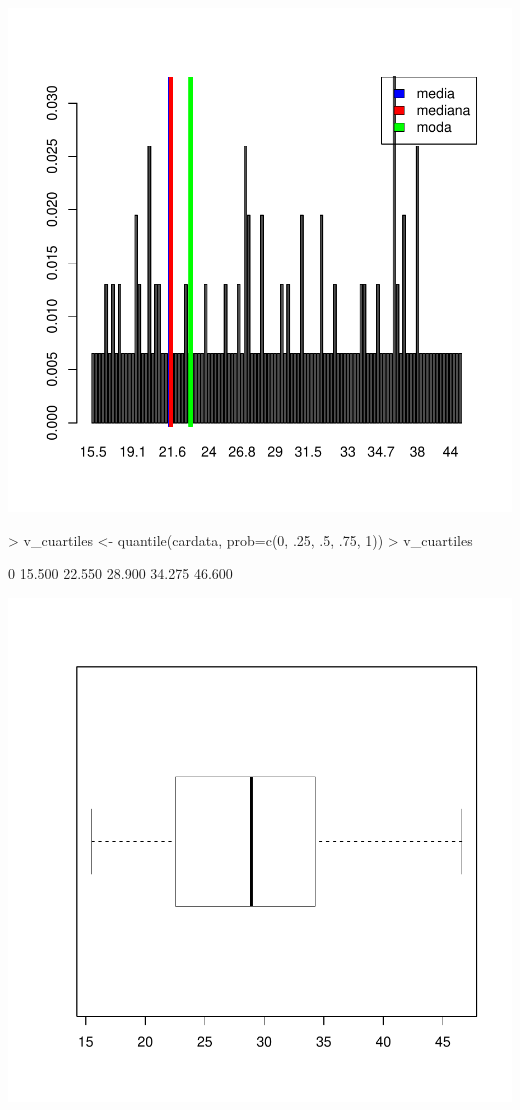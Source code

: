 \documentclass [a4paper] {article}
\begin{document}
\begin{center}
\includegraphics{entrega-018}
\begin{Schunk}
\begin{Sinput}
> v_cuartiles <- quantile(cardata, prob=c(0, .25, .5, .75, 1))
> v_cuartiles
\end{Sinput}
\begin{Soutput}
    0%
15.500 22.550 28.900 34.275 46.600 
\end{Soutput}
\end{Schunk}
\includegraphics{entrega-020}



\end{center}
\end{document}
